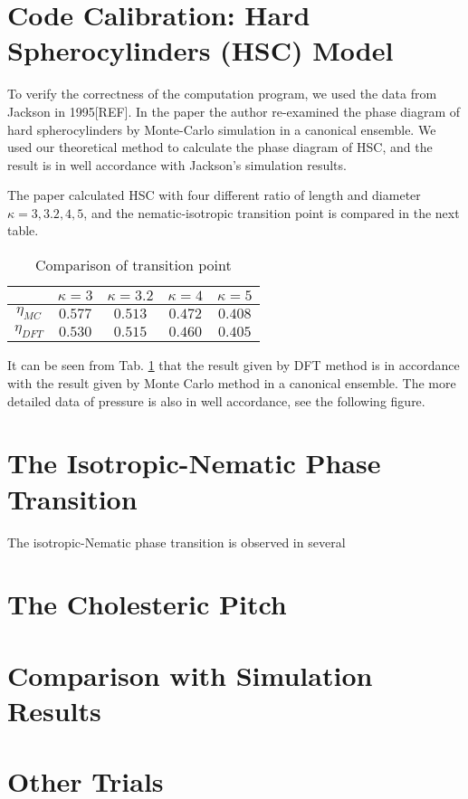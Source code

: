 \section{Code Calibration: Hard Spherocylinders (HSC) Model}
To verify the correctness of the computation program, we used the data from Jackson in 1995[REF]. In the paper the author re-examined the phase diagram of hard spherocylinders by Monte-Carlo simulation in a canonical ensemble. We used our theoretical method to calculate the phase diagram of HSC, and the result is in well accordance with Jackson's simulation results.

The paper calculated HSC with four different ratio of length and diameter $\kappa=3,3.2,4,5$, and the nematic-isotropic transition point is compared in the next table.

\begin{table}[h!]
	\caption{Comparison of transition point}
	\label{tab:comparison1995}
	\centering
	\begin{tabular}{c|cccc}
		\toprule
		 & $\kappa=3$ & $\kappa=3.2$ & $\kappa=4$ & $\kappa=5$\\
		\midrule
		$\eta_{MC}$ &  $0.577$ & $0.513$ & $0.472$ & $0.408$\\
		$\eta_{DFT}$ & $0.530$ & $0.515$ & $0.460$ & $0.405$\\
		\bottomrule
	\end{tabular}
\end{table}

It can be seen from Tab. \ref{tab:comparison1995} that the result given by DFT method is in accordance with the result given by Monte Carlo method in a canonical ensemble. The more detailed data of pressure is also in well accordance, see the following figure.


\section{The Isotropic-Nematic Phase Transition}
The isotropic-Nematic phase transition is observed in several

\section{The Cholesteric Pitch}

\section{Comparison with Simulation Results}

\section{Other Trials }

